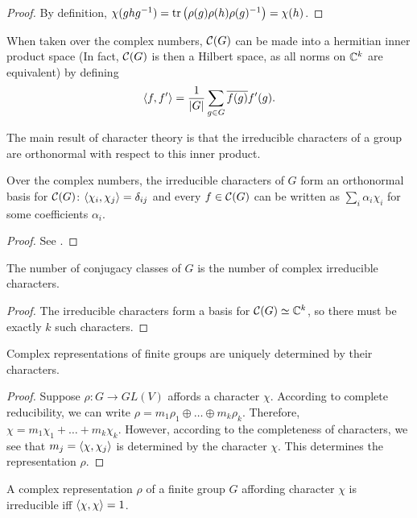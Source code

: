 \documentclass[a4paper]{article}
\begin{document}
\begin{proof}
    By definition, $\chi(ghg^{-1}) = \operatorname{tr}\left(\rho(g)\rho(h)\rho(g)^{-1}\right) = \chi(h)$. 
\end{proof}

When taken over the complex numbers, $\mathcal{C}(G)$ can be made into a hermitian inner product space (In fact, $\mathcal{C}(G)$ is then a Hilbert space, as all norms on $\mathbb{C}^k$ are equivalent) by defining 
$$\left\langle f , f' \right\rangle = \frac{1}{|G|}\sum_{g\in G} \overline{f(g)}f'(g).$$

The main result of character theory is that the irreducible characters of a group are orthonormal with respect to this inner product.

\begin{thm}
    Over the complex numbers, the irreducible characters of $G$ form an orthonormal basis for $\mathcal{C}(G)$: $\left\langle \chi_i , \chi_j \right\rangle = \delta_{ij}$ and every $f \in \mathcal{C}(G)$ can be written as $\sum_i \alpha_i \chi_i$ for some coefficients $\alpha_i$.
\end{thm}

\begin{proof}
    See \cite{dexter}.
\end{proof}

\begin{cor}
    The number of conjugacy classes of $G$ is the number of complex irreducible characters.
\end{cor}

\begin{proof}
    The irreducible characters form a basis for $\mathcal{C}(G) \simeq \mathbb{C}^k$, so there must be exactly $k$ such characters.
\end{proof}

\begin{cor}
    Complex representations of finite groups are uniquely determined by their characters.
\end{cor}

\begin{proof}
    Suppose $\rho: G \to GL(V)$ affords a character $\chi$. According to complete reducibility, we can write $\rho = m_1\rho_1 \oplus \hdots \oplus m_k \rho_k$. Therefore, $\chi = m_1\chi_1 + \hdots + m_k \chi_k$. However, according to the completeness of characters, we see that $m_j = \left\langle \chi , \chi_j \right\rangle$ is determined by the character $\chi$. This determines the representation $\rho$.
\end{proof}

\begin{cor}
    A complex representation $\rho$ of a finite group $G$ affording character $\chi$ is irreducible iff $\left\langle \chi , \chi \right\rangle = 1$.
\end{cor}
\end{document}
